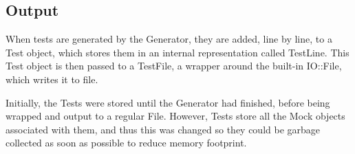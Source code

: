   \subsection{Output}
    When tests are generated by the Generator, they are added, line by line, to a Test object, which stores them in an internal representation called TestLine.
    This Test object is then passed to a TestFile, a wrapper around the built-in IO::File, which writes it to file.

    Initially, the Tests were stored until the Generator had finished, before being wrapped and output to a regular File.
    However, Tests store all the Mock objects associated with them, and thus this was changed so they could be garbage collected as soon as possible to reduce memory footprint.
    
    
